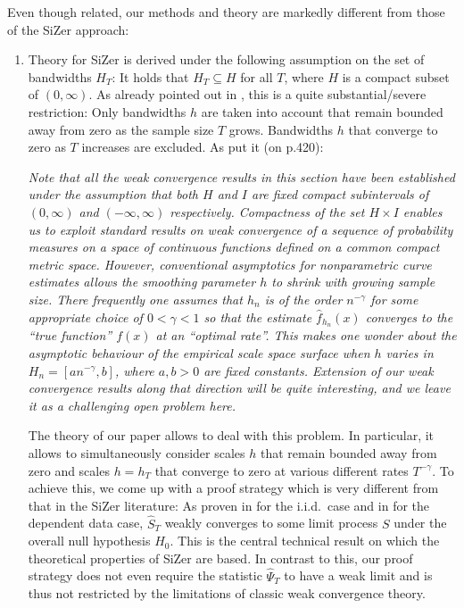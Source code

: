 \documentclass[a4paper,12pt]{article}
\begin{document}
Even though related, our methods and theory are markedly different from those of the SiZer approach:
\begin{enumerate}[label=(\roman*), leftmargin=0.8cm]

\item Theory for SiZer is derived under the following assumption on the set of bandwidths $H_T$: It holds that $H_T \subseteq H$ for all $T$, where $H$ is a compact subset of $(0,\infty)$. As already pointed out in \cite{ChaudhuriMarron2000}, this is a quite substantial/severe restriction: Only bandwidths $h$ are taken into account that remain bounded away from zero as the sample size $T$ grows. Bandwidths $h$ that converge to zero as $T$ increases are excluded.  As \cite{ChaudhuriMarron2000} put it (on p.420):
\vspace{0.15cm}

\begin{spacing}{1.1}
{\small \textit{Note that all the weak convergence results in this section have been established under the assumption that both $H$ and $I$ are fixed compact subintervals of $(0,\infty)$ and $(-\infty,\infty)$ respectively. Compactness of the set $H \times I$ enables us to exploit standard results on weak convergence of a sequence of probability measures on a space of continuous functions defined on a common compact metric space. However, conventional asymptotics for nonparametric curve estimates allows the smoothing parameter $h$ to shrink with growing sample size. There frequently one assumes that $h_n$ is of the order $n^{-\gamma}$ for some appropriate choice of $0 < \gamma < 1$ so that the estimate $\hat{f}_{h_n}(x)$ converges to the ``true function'' $f(x)$ at an ``optimal rate''. This makes one wonder about the asymptotic behaviour of the empirical scale space surface when $h$ varies in $H_n = [a n^{-\gamma},b]$, where $a,b > 0$ are fixed constants. Extension of our weak convergence results along that direction will be quite interesting, and we leave it as a challenging open problem here.} }
\end{spacing} 
\vspace{0.2cm}

The theory of our paper allows to deal with this problem. In particular, it allows to simultaneously consider scales $h$ that remain bounded away from zero and scales $h = h_T$ that converge to zero at various different rates $T^{-\gamma}$. To achieve this, we come up with a proof strategy which is very different from that in the SiZer literature:  As proven in \cite{ChaudhuriMarron2000} for the i.i.d.\ case and in \cite{ParkHannigKang2009} for the dependent data case, $\widehat{S}_T$ weakly converges to some limit process $S$ under the overall null hypothesis $H_0$. This is the central technical result on which the theoretical properties of SiZer are based. In contrast to this, our proof strategy does not even require the statistic $\widehat{\Psi}_T$ to have a weak limit and is thus not restricted by the limitations of classic weak convergence theory. 


\end{enumerate}
\end{document}
